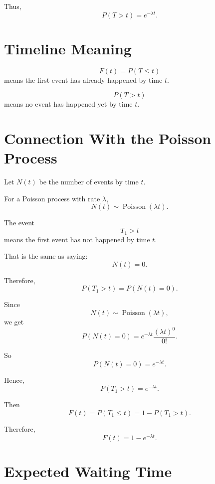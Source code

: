 \documentclass[12pt]{article}
\begin{document}
Thus,
\[
\boxed{P(T>t)=e^{-\lambda t}.}
\]

\section{Timeline Meaning}

\begin{center}
\end{center}

\[
F(t)=P(T\leq t)
\]
means the first event has already happened by time \(t\).

\[
P(T>t)
\]
means no event has happened yet by time \(t\).

\section{Connection With the Poisson Process}

Let \(N(t)\) be the number of events by time \(t\).

For a Poisson process with rate \(\lambda\),
\[
N(t)\sim \operatorname{Poisson}(\lambda t).
\]

The event
\[
T_1>t
\]
means the first event has not happened by time \(t\).

That is the same as saying:
\[
N(t)=0.
\]

Therefore,
\[
P(T_1>t)=P(N(t)=0).
\]

Since
\[
N(t)\sim \operatorname{Poisson}(\lambda t),
\]
we get
\[
P(N(t)=0)=e^{-\lambda t}\frac{(\lambda t)^0}{0!}.
\]

So
\[
P(N(t)=0)=e^{-\lambda t}.
\]

Hence,
\[
\boxed{P(T_1>t)=e^{-\lambda t}.}
\]

Then
\[
F(t)=P(T_1\leq t)=1-P(T_1>t).
\]

Therefore,
\[
\boxed{F(t)=1-e^{-\lambda t}.}
\]

\section{Expected Waiting Time}
\end{document}
